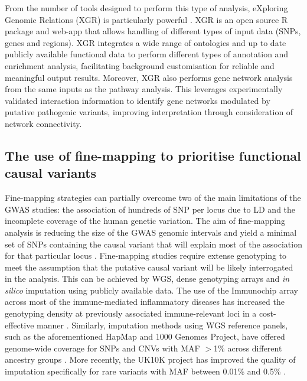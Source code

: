 From the number of tools designed to perform this type of analysis, eXploring Genomic Relations (XGR) is particularly powerful \parencite{Fang2016 }. XGR is an open source R package and web-app that allows handling of different types of input data (SNPs, genes and regions). XGR integrates a wide range of ontologies and up to date publicly available functional data to perform different types of annotation and enrichment analysis, facilitating background customisation for reliable and meaningful output results. Moreover, XGR also performs gene network analysis from the same inputs as the pathway analysis. This leverages experimentally validated interaction information to identify gene networks modulated by putative pathogenic variants, improving interpretation through consideration of network connectivity.

\subsection{The use of fine-mapping to prioritise functional causal variants}
Fine-mapping strategies can partially overcome two of the main limitations of the GWAS studies: the association of hundreds of SNP per locus due to LD and the incomplete coverage of the human genetic variation. The aim of fine-mapping analysis is reducing the size of the GWAS genomic intervals and yield a minimal set of SNPs containing the causal variant that will explain most of the association for that particular locus \parencite{Spain2015}. Fine-mapping studies require extense genotyping to meet the assumption that the putative causal variant will be likely interrogated in the analysis. This can be achieved by WGS, dense genotyping arrays and \textit{in silico} imputation using publicly available data. The use of the Immunochip array across most of the immune-mediated inflammatory diseases has increased the genotyping density at previously associated immune-relevant loci in a cost-effective manner \parencite{Trynka2011}. Similarly, imputation methods using WGS reference panels, such as the aforementioned HapMap and 1000 Genomes Project, have offered genome-wide coverage for SNPs and CNVs with MAF $>$1\% across different ancestry groups \parencite{Abecasis2012}. More recently, the UK10K project has improved the quality of imputation specifically for rare variants with MAF between 0.01\% and 0.5\% \parencite{Chou2016}. 

